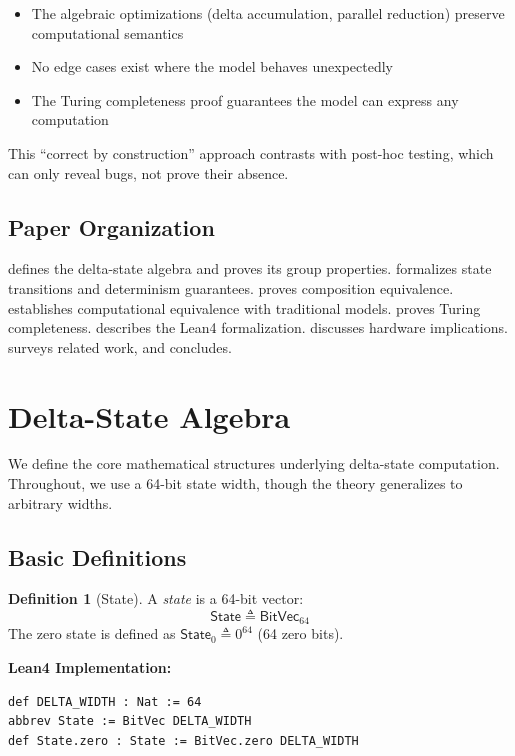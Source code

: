 \documentclass[11pt,letterpaper]{article}
\theoremstyle{plain}
\theoremstyle{definition}
\newtheorem{definition}[theorem]{Definition}
\theoremstyle{remark}
\newcommand{\StateType}{\mathsf{State}}
\newcommand{\BitVec}[1]{\mathsf{BitVec}_{#1}}
\begin{document}
\begin{itemize}
    \item The algebraic optimizations (delta accumulation, parallel reduction) preserve computational semantics
    \item No edge cases exist where the model behaves unexpectedly
    \item The Turing completeness proof guarantees the model can express any computation
\end{itemize}

This ``correct by construction'' approach contrasts with post-hoc testing, which can only reveal bugs, not prove their absence.

\subsection{Paper Organization}

 defines the delta-state algebra and proves its group properties.  formalizes state transitions and determinism guarantees.  proves composition equivalence.  establishes computational equivalence with traditional models.  proves Turing completeness.  describes the Lean4 formalization.  discusses hardware implications.  surveys related work, and  concludes.

\section{Delta-State Algebra}
\label{sec:algebra}

We define the core mathematical structures underlying delta-state computation. Throughout, we use a 64-bit state width, though the theory generalizes to arbitrary widths.

\subsection{Basic Definitions}

\begin{definition}[State]
\label{def:state}
A \emph{state} is a 64-bit vector:
\[
\StateType \triangleq \BitVec{64}
\]
The zero state is defined as $\StateType_0 \triangleq 0^{64}$ (64 zero bits).

\medskip
\noindent\textbf{Lean4 Implementation:}
\begin{lstlisting}
def DELTA_WIDTH : Nat := 64
abbrev State := BitVec DELTA_WIDTH
def State.zero : State := BitVec.zero DELTA_WIDTH
\end{lstlisting}
\end{definition}
\end{document}
